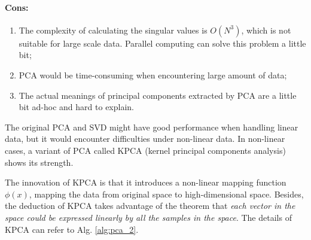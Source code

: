 \documentclass[12pt,a4paper]{article}
\theoremstyle{definition}
\begin{document}
\vspace{-0.03\linewidth}
\paragraph{Cons:}
\begin{enumerate}
	\item The complexity of calculating the singular values is $O(N^3)$, which is not suitable for large scale data. Parallel computing can solve this problem a little bit;
	
	\item PCA would be time-consuming when encountering large amount of data;
	
	\item The actual meanings of principal components extracted by PCA are a little bit ad-hoc and hard to explain.
\end{enumerate}

The original PCA and SVD might have good performance when handling linear data, but it would encounter difficulties under non-linear data. In non-linear cases, a variant of PCA called KPCA (kernel principal components analysis) shows its strength.

The innovation of KPCA is that it introduces a non-linear mapping function $\phi(x)$, mapping the data from original space to high-dimensional space. Besides, the deduction of KPCA takes advantage of the theorem that \textit{each vector in the space could be expressed linearly by all the samples in the space}. The details of KPCA can refer to Alg. \ref{alg:pca_2}.
\end{document}
